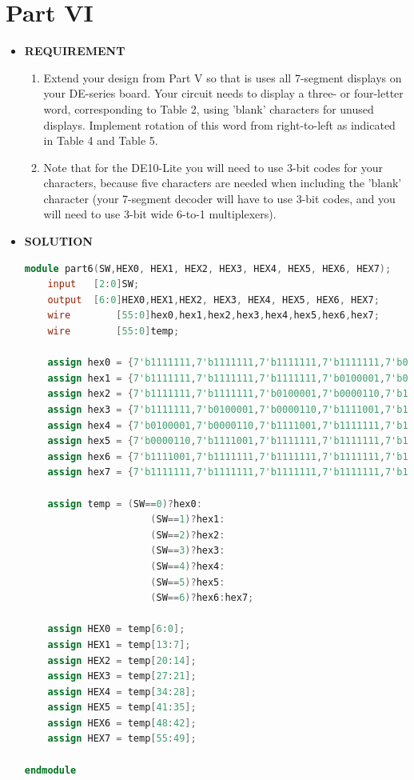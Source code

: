 \documentclass[a4paper, 12pt]{report}
\begin{document}
\section{Part VI }
\begin{itemize}
    \item [] \textbf{REQUIREMENT}
        \begin{enumerate}
            \item Extend your design from Part V so that is uses all 7-segment displays on your DE-series board. Your circuit needs to display a three- or four-letter word, corresponding to Table 2, using 'blank' characters for unused displays. Implement rotation of this word from right-to-left as indicated in Table 4 and Table 5. 
            \item Note that for the DE10-Lite you will need to use 3-bit codes for your characters, because five characters are needed when including the 'blank' character (your 7-segment decoder will have to use 3-bit codes, and you will need to use 3-bit wide 6-to-1 multiplexers). 
        \end{enumerate}
    \item [] \textbf{SOLUTION}
        \begin{lstlisting}[language=Verilog]
module part6(SW,HEX0, HEX1, HEX2, HEX3, HEX4, HEX5, HEX6, HEX7);
	input 	[2:0]SW;
	output 	[6:0]HEX0,HEX1,HEX2, HEX3, HEX4, HEX5, HEX6, HEX7;
	wire		[55:0]hex0,hex1,hex2,hex3,hex4,hex5,hex6,hex7;
	wire		[55:0]temp;

	assign hex0 = {7'b1111111,7'b1111111,7'b1111111,7'b1111111,7'b0100001,7'b0000110,7'b1111001,7'b1111111};
	assign hex1 = {7'b1111111,7'b1111111,7'b1111111,7'b0100001,7'b0000110,7'b1111001,7'b1111111,7'b1111111};
	assign hex2 = {7'b1111111,7'b1111111,7'b0100001,7'b0000110,7'b1111001,7'b1111111,7'b1111111,7'b1111111};
	assign hex3 = {7'b1111111,7'b0100001,7'b0000110,7'b1111001,7'b1111111,7'b1111111,7'b1111111,7'b1111111};
	assign hex4 = {7'b0100001,7'b0000110,7'b1111001,7'b1111111,7'b1111111,7'b1111111,7'b1111111,7'b1111111};
	assign hex5 = {7'b0000110,7'b1111001,7'b1111111,7'b1111111,7'b1111111,7'b1111111,7'b1111111,7'b0100001};
	assign hex6 = {7'b1111001,7'b1111111,7'b1111111,7'b1111111,7'b1111111,7'b1111111,7'b0100001,7'b0000110};
	assign hex7 = {7'b1111111,7'b1111111,7'b1111111,7'b1111111,7'b1111111,7'b0100001,7'b0000110,7'b1111001};
	
	assign temp = (SW==0)?hex0: 
					  (SW==1)?hex1:
					  (SW==2)?hex2:
					  (SW==3)?hex3:
					  (SW==4)?hex4:
					  (SW==5)?hex5:
					  (SW==6)?hex6:hex7;
					  
	assign HEX0 = temp[6:0];
	assign HEX1 = temp[13:7];
	assign HEX2 = temp[20:14];
	assign HEX3 = temp[27:21];
	assign HEX4 = temp[34:28];
	assign HEX5 = temp[41:35];
	assign HEX6 = temp[48:42];
	assign HEX7 = temp[55:49];
	
endmodule
    \end{lstlisting}
\end{itemize}
\end{document}

